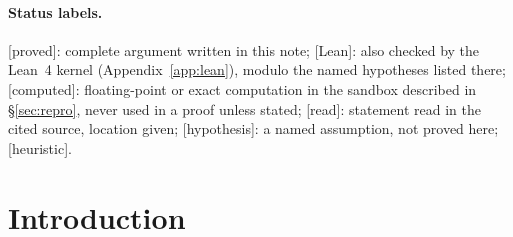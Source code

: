\documentclass[11pt,a4paper]{article}
\theoremstyle{plain}
\theoremstyle{definition}
\theoremstyle{remark}
\numberwithin{equation}{section}
\newcommand{\st}[1]{\textsf{[#1]}}
\begin{document}
\begin{abstract}
\emph{Version 1.1 (12 November 2026): literature corrections only.} The principle that an inequality between partition functions of finite periodic tori (twisted against untwisted) implies decay is classical (Tomboulis--Yaffe, Kov\'acs--Tomboulis, Kanazawa), and the comparison with these papers is recorded in \S\ref{sec:compare}.

\emph{Version 1.2 (12 November 2026).} Adds Section~\ref{sec:reverse} (Theorem~\ref{thm:R}, its remarks and the conditional Corollary~\ref{cor:bridge}), the second Lean file  and its combination with the published file , an example showing that positivity of the transfer operator cannot be dropped (Remark~\ref{rem:Rused}), and rewrites \S\ref{sec:bb26v5} and the related statements. The statements, proofs and Lean files of versions 1.0 and 1.1 are not changed:  and  are byte for byte those of version 1.0.
\end{abstract}

\paragraph{Status labels.}
\st{proved}: complete argument written in this note; \st{Lean}: also checked by the Lean~4 kernel (Appendix~\ref{app:lean}), modulo
the named hypotheses listed there; \st{computed}: floating-point or exact computation in the sandbox described in
\S\ref{sec:repro}, never used in a proof unless stated; \st{read}: statement read in the cited source, location given;
\st{hypothesis}: a named assumption, not proved here; \st{heuristic}.

{\small\setcounter{tocdepth}{1}\tableofcontents}

\section{Introduction}\label{sec:intro}
\end{document}
